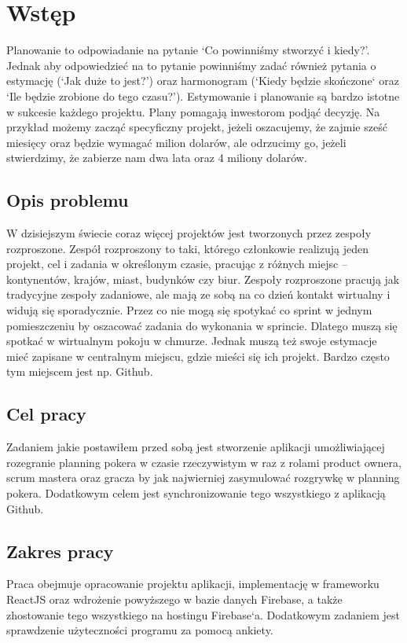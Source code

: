 \chapter*{Wstęp}

Planowanie to odpowiadanie na pytanie `Co powinniśmy stworzyć i kiedy?'.
Jednak aby odpowiedzieć na to pytanie powinniśmy zadać również pytania o estymację
(`Jak duże to jest?') oraz harmonogram (`Kiedy będzie skończone` oraz `Ile będzie zrobione do tego czasu?'). Estymowanie i planowanie są bardzo istotne w sukcesie każdego projektu. Plany pomagają inwestorom podjąć decyzję. Na przykład możemy zacząć specyficzny projekt, jeżeli oszacujemy, że zajmie sześć miesięcy oraz będzie wymagać milion dolarów, ale odrzucimy go, jeżeli stwierdzimy, że zabierze nam dwa lata oraz 4 miliony dolarów.\cite{Cohen_2006}

\section*{Opis problemu}

W dzisiejszym świecie coraz więcej projektów jest tworzonych przez zespoły rozproszone. Zespół rozproszony to taki, którego członkowie realizują jeden projekt, cel i zadania w określonym czasie, pracując z różnych miejsc – kontynentów, krajów, miast, budynków czy biur. Zespoły rozproszone pracują jak tradycyjne zespoły zadaniowe, ale mają ze sobą na co dzień kontakt wirtualny i widują się sporadycznie.\cite{www_rozproszony} Przez co nie mogą się spotykać co sprint w jednym pomieszczeniu by oszacować zadania do wykonania w sprincie. Dlatego muszą się spotkać w wirtualnym pokoju w chmurze. Jednak muszą też swoje estymacje mieć zapisane w centralnym miejscu, gdzie mieści się ich projekt. Bardzo często tym miejscem jest np. Github.

\section*{Cel pracy}

Zadaniem jakie postawiłem przed sobą jest stworzenie aplikacji umożliwiającej rozegranie planning pokera w czasie rzeczywistym w raz z rolami product ownera, scrum mastera oraz gracza by jak najwierniej zasymulować rozgrywkę w planning pokera. Dodatkowym celem jest synchronizowanie tego wszystkiego z aplikacją Github.

\section*{Zakres pracy}

Praca obejmuje opracowanie projektu aplikacji, implementację w frameworku ReactJS oraz wdrożenie powyższego w bazie danych Firebase, a także zhostowanie tego wszystkiego na hostingu Firebase`a. Dodatkowym zadaniem jest sprawdzenie użyteczności programu za pomocą ankiety.

